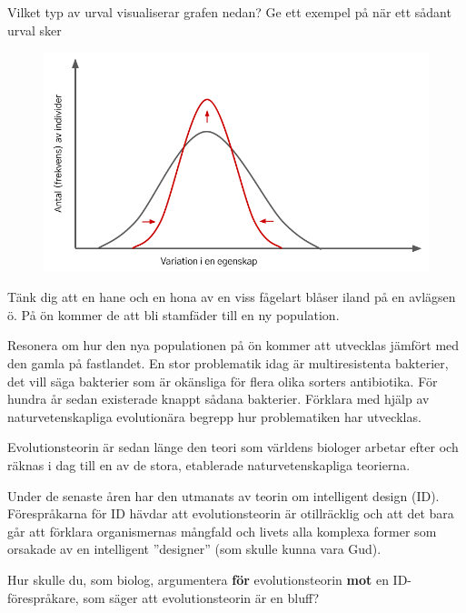 \documentclass{exam}
\begin{document}
\begin{questions}
\vspace{10mm}
\question
Vilket typ av urval visualiserar grafen nedan? Ge ett exempel på när ett sådant urval sker

\begin{figure}[h]
    \centering
    \includegraphics[width=0.7\linewidth]{06f57399-163d-4981-a6b3-9370f8174f29.png}
\end{figure}
\break
\vspace{5mm} %
\begin{center}
\end{center}
\question 
Tänk dig att en hane och en hona av en viss fågelart blåser iland på en avlägsen ö. På ön kommer de att bli stamfäder till en ny population.

Resonera om hur den nya populationen på ön kommer att utvecklas jämfört med den gamla på fastlandet.
\vspace{60mm}
\question
En stor problematik idag är multiresistenta bakterier, det vill säga bakterier som är okänsliga för flera olika sorters antibiotika. För hundra år sedan existerade knappt sådana bakterier. Förklara med hjälp av naturvetenskapliga evolutionära begrepp hur problematiken har utvecklas.

\break
\question
Evolutionsteorin är sedan länge den teori som världens biologer arbetar efter och räknas i dag till en av de stora, etablerade naturvetenskapliga teorierna.

Under de senaste åren har den utmanats av teorin om intelligent design (ID). Förespråkarna för ID hävdar att evolutionsteorin är otillräcklig och att det bara går att förklara organismernas mångfald och livets alla komplexa former som orsakade av en intelligent ”designer” (som skulle kunna vara Gud).

Hur skulle du, som biolog, argumentera \textbf{för} evolutionsteorin \textbf{mot } en ID-förespråkare, som säger att evolutionsteorin är en bluff?


\end{questions}
\end{document}
